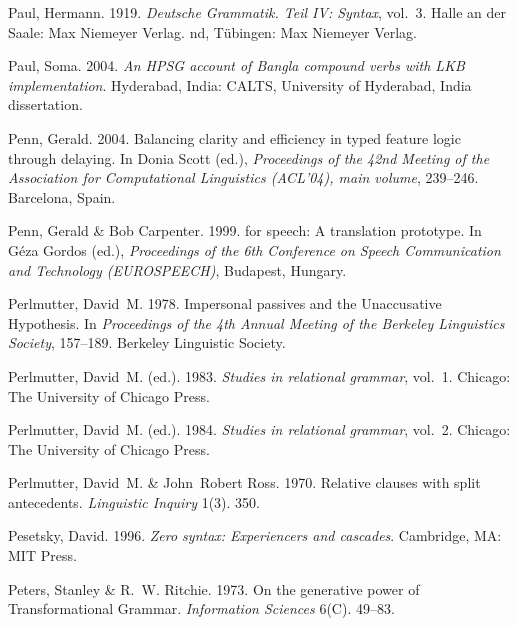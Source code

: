 \begin{thebibliography}{1420}
Paul, Hermann. 1919.
\newblock \emph{{Deutsche Grammatik. Teil IV: Syntax}}, vol.~3.
\newblock Halle an der Saale: Max Niemeyer Verlag.
\newblock \2nd, T{\"u}bingen: Max Niemeyer Verlag.

Paul, Soma. 2004.
\newblock \emph{An {HPSG} account of {Bangla} compound verbs with {LKB}
  implementation}.
\newblock Hyderabad, India: CALTS, University of Hyderabad, India dissertation.

Penn, Gerald. 2004.
\newblock Balancing clarity and efficiency in typed feature logic through
  delaying.
\newblock In Donia Scott (ed.), \emph{Proceedings of the {42nd Meeting of the
  Association for Computational Linguistics (ACL}'04), main volume}, 239--246.
  Barcelona, Spain.

Penn, Gerald \& Bob Carpenter. 1999.
 for speech: {A} translation prototype.
\newblock In G{\'e}za Gordos (ed.), \emph{Proceedings of the {6th Conference on
  Speech Communication and Technology (EUROSPEECH)}}, Budapest, Hungary.

Perlmutter, David~M. 1978.
\newblock Impersonal passives and the {Unaccusative Hypothesis}.
\newblock In \emph{Proceedings of the {4th Annual Meeting of the Berkeley
  Linguistics Society}}, 157--189. {Berkeley Linguistic Society}.

Perlmutter, David~M. (ed.). 1983.
\newblock \emph{Studies in relational grammar}, vol.~1.
\newblock Chicago: The University of Chicago Press.

Perlmutter, David~M. (ed.). 1984.
\newblock \emph{Studies in relational grammar}, vol.~2.
\newblock Chicago: The University of Chicago Press.

Perlmutter, David~M. \& John~Robert Ross. 1970.
\newblock Relative clauses with split antecedents.
\newblock \emph{Linguistic Inquiry} 1(3). 350.

Pesetsky, David. 1996.
\newblock \emph{Zero syntax: {Experiencers} and cascades}.
\newblock Cambridge, MA: MIT Press.

Peters, Stanley \& R.~W. Ritchie. 1973.
\newblock On the generative power of {Transformational Grammar}.
\newblock \emph{Information Sciences} 6(C). 49--83.


\end{thebibliography}
